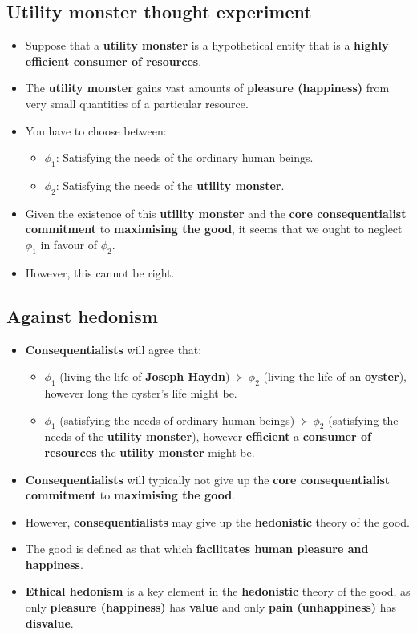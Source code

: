 \documentclass[11pt]{article}
\begin{document}
\subsection{Utility monster thought experiment}
\label{sec:org9af4ffb}
\begin{itemize}
\item Suppose that a \textbf{utility monster} is a hypothetical entity that is a \textbf{highly efficient consumer of resources}.
\item The \textbf{utility monster} gains vast amounts of \textbf{pleasure (happiness)} from very small quantities of a particular resource.
\item You have to choose between:
\begin{itemize}
\item \(\phi_1\): Satisfying the needs of the ordinary human beings.
\item \(\phi_2\): Satisfying the needs of the \textbf{utility monster}.
\end{itemize}
\item Given the existence of this \textbf{utility monster} and the \textbf{core consequentialist commitment} to \textbf{maximising the good}, it seems that we ought to neglect \(\phi_1\) in favour of \(\phi_2\).
\item However, this cannot be right.
\end{itemize}
\subsection{Against hedonism}
\label{sec:orgbe4b457}
\begin{itemize}
\item \textbf{Consequentialists} will agree that:
\begin{itemize}
\item \(\phi_1\) (living the life of \textbf{Joseph Haydn}) \(\succ \phi_2\) (living the life of an \textbf{oyster}), however long the oyster's life might be.
\item \(\phi_1\) (satisfying the needs of ordinary human beings) \(\succ \phi_2\) (satisfying the needs of the \textbf{utility monster}), however \textbf{efficient} a \textbf{consumer of resources} the \textbf{utility monster} might be.
\end{itemize}
\item \textbf{Consequentialists} will typically not give up the \textbf{core consequentialist commitment} to \textbf{maximising the good}.
\item However, \textbf{consequentialists} may give up the \textbf{hedonistic} theory of the good.
\item The good is defined as that which \textbf{facilitates human pleasure and happiness}.
\item \textbf{Ethical hedonism} is a key element in the \textbf{hedonistic} theory of the good, as only \textbf{pleasure (happiness)} has \textbf{value} and only \textbf{pain (unhappiness)} has \textbf{disvalue}.
\end{itemize}
\end{document}
